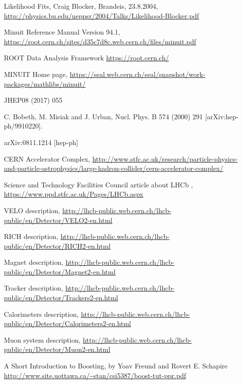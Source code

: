 \documentclass[english]{uzhpub}
\begin{document}
 \begin{thebibliography}{100}

    Likelihood Fits, Craig Blocker, Brandeis, 23.8.2004,
   \url{http://physics.bu.edu/neppsr/2004/Talks/Likelihood-Blocker.pdf}

     Minuit Reference Manual Version 94.1, \url{https://root.cern.ch/sites/d35c7d8c.web.cern.ch/files/minuit.pdf}

    ROOT Data Analysis Framework \url{https://root.cern.ch/}

    MINUIT Home page, \url{https://seal.web.cern.ch/seal/snapshot/work-packages/mathlibs/minuit/}

    JHEP08 (2017) 055

     C. Bobeth, M. Misiak and J. Urban, Nucl. Phys. B 574 (2000) 291 [arXiv:hep-ph/9910220].

    	arXiv:0811.1214 [hep-ph]

    CERN Accelerator Complex,
   \url{http://www.stfc.ac.uk/research/particle-physics-and-particle-astrophysics/large-hadron-collider/cern-accelerator-complex/}

    Science and Technology Facilities Council article about LHCb ,
   \url{https://www.ppd.stfc.ac.uk/Pages/LHCb.aspx}

    VELO description,
   \url{http://lhcb-public.web.cern.ch/lhcb-public/en/Detector/VELO2-en.html}

    RICH description,
   \url{http://lhcb-public.web.cern.ch/lhcb-public/en/Detector/RICH2-en.html}

    Magnet description,
   \url{http://lhcb-public.web.cern.ch/lhcb-public/en/Detector/Magnet2-en.html}

    Tracker description,
   \url{http://lhcb-public.web.cern.ch/lhcb-public/en/Detector/Trackers2-en.html}

    Calorimeters description,
   \url{http://lhcb-public.web.cern.ch/lhcb-public/en/Detector/Calorimeters2-en.html}

    Muon system description,
   \url{http://lhcb-public.web.cern.ch/lhcb-public/en/Detector/Muon2-en.html}

     A Short Introduction to Boosting, by Yoav Freund and Rovert E. Schapire \url{http://www.site.uottawa.ca/~stan/csi5387/boost-tut-ppr.pdf}


\end{thebibliography}
\end{document}
